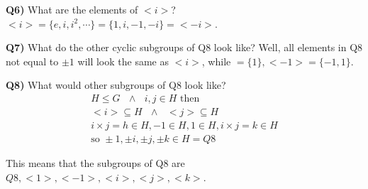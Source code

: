 \documentclass[12pt]{article}
\begin{document}
\noindent 
\textbf{Q6)} What are the elements of \(<i>\)? 
\(<i> = \{e, i, i^2,\cdots\} = \{1, i, -1, -i\} = < -i> \).

\noindent 
\textbf{Q7)} What do the other cyclic subgroups of Q8 look like? 
Well, all elements in Q8 not equal to \(\pm 1\) will look the same as \(<i>\), while 
\(<1> = \{1\}, <-1> = \{-1, 1\}\). 

\noindent 
\textbf{Q8)}
What would other subgroups of Q8 look like?
\begin{gather*}
  H \leq G \text{ } \land \text{ } i,j \in H \text{ then } \\ 
  <i> \subseteq H \text{ } \land \text{ } <j> \subseteq H \\ 
  i \times j = h \in H, -1 \in H, 1 \in H, i \times j = k \in H \\ 
  \text{so } \pm 1, \pm i, \pm j, \pm k \in H = Q8
\end{gather*}

\noindent 
This means that the subgroups of Q8 are \(Q8, <1>, <-1>, <i>, <j>, <k>\).
\end{document}
